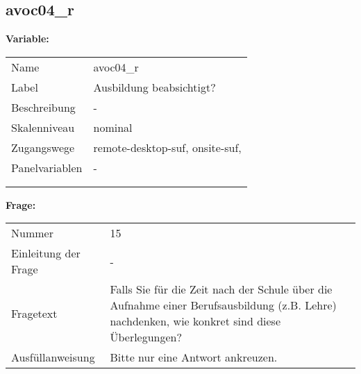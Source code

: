 	
	
	\subsection{avoc04\_r}
	\label{subSection:avoc04_r}

	\noindent\textbf{Variable:}\\
		\begin{tabular}{lL{11.3cm}}
			\label{tableVariable:avoc04_r}
			Name & avoc04\_r \\
			Label & Ausbildung beabsichtigt? \\
			Beschreibung & - \\
			Skalenniveau & nominal \\
			Zugangswege &
				remote-desktop-suf,
				onsite-suf,
 \\
			Panelvariablen & -
			 \\
			 \\
 \\
		\end{tabular}

		\vspace*{1 cm}
		\noindent\textbf{Frage:}\\
		\begin{tabular}{lL{11.3cm}}
			\label{tableQuestion:avoc04_r}
			Nummer & 15 \\
			Einleitung der Frage & - \\
			Fragetext & Falls Sie für die Zeit nach der Schule über die Aufnahme einer Berufsausbildung (z.B. Lehre) nachdenken, wie konkret sind diese Überlegungen? \\
			Ausfüllanweisung & Bitte nur eine Antwort ankreuzen. \\
		\end{tabular}






